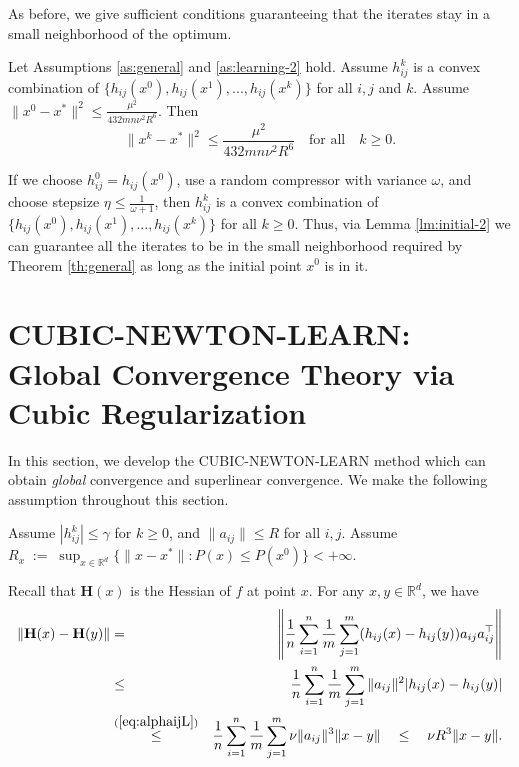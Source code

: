 \documentclass[12pt]{article}
\newcommand{\eqdef}{\; { := }\;}
\newcommand{\R}{\mathbb{R}}
\newcommand{\newalpha}{h}
\newcommand{\mH}{\mathbf{H}}
\begin{document}
As before, we give sufficient conditions guaranteeing that the iterates stay in a small neighborhood of the optimum.
\begin{lemma}\label{lm:initial-2}
	Let Assumptions \ref{as:general} and \ref{as:learning-2} hold. Assume $h_{ij}^k$ is a convex combination of $\{  \newalpha_{ij}(x^0), \newalpha_{ij}(x^1), ..., \newalpha_{ij}(x^k)  \}$ for all $i,j$ and $k$. Assume $\|x^0 - x^*\|^2 \leq \frac{\mu^2}{432mn \nu^2R^6}$. Then 	$$
	\|x^k - x^*\|^2 \leq \frac{\mu^2}{432mn \nu^2R^6} \quad \text{for all} \quad k\geq 0. $$
\end{lemma}


If we choose $h_{ij}^0 = \newalpha_{ij}(x^0)$, use a random  compressor with variance $\omega$, and choose stepsize $\eta \leq \frac{1}{\omega + 1}$, then $h_{ij}^k$ is a convex combination of $\{  \newalpha_{ij}(x^0), \newalpha_{ij}(x^1), ..., \newalpha_{ij}(x^k)  \}$ for all $k\geq 0$. Thus, via Lemma \ref{lm:initial-2} we can guarantee all the iterates to be in the small neighborhood required by Theorem \ref{th:general} as long as the initial point $x^0$ is in it.  





\section{{\sf CUBIC-NEWTON-LEARN}: Global Convergence Theory via Cubic Regularization} \label{sec:CUBIC-NEWTON-LEARN}



In this section, we develop the {\sf CUBIC-NEWTON-LEARN} method which can obtain {\em global} convergence and superlinear convergence.  We make the following assumption throughout this section.

\begin{assumption}\label{as:cubic}
	Assume $|h_{ij}^k| \leq \gamma$ for $k\geq 0$, and $\|a_{ij}\| \leq R$ for all $i,j$. Assume $R_x \eqdef \sup_{x\in \R^d} \{  \|x-x^*\| : P(x) \leq P(x^0)  \} < + \infty$. 
\end{assumption}


Recall that $\mH(x)$ is the Hessian of $f$ at point $x$. For any $x, y \in \R^d$, we have 
\begin{eqnarray*}
\|\mH(x) - \mH(y)\|	&= & \left\| \frac{1}{n} \sum \limits_{i=1}^n \frac{1}{m} \sum\limits_{j=1}^{m}( \newalpha_{ij}(x) - \newalpha_{ij}(y) )a_{ij}a_{ij}^\top  \right\| \\ 
&\leq & \frac{1}{n} \sum\limits_{i=1}^n \frac{1}{m} \sum\limits_{j=1}^{m} \|a_{ij}\|^2 |\newalpha_{ij}(x) - \newalpha_{ij}(y)| \\ 
&\overset{(\ref{eq:alphaijL})}{\leq} & \frac{1}{n} \sum\limits_{i=1}^n \frac{1}{m} \sum\limits_{j=1}^{m} \nu \|a_{ij}\|^3 \|x-y\| \quad \leq \quad \nu R^3 \|x-y\|. 
\end{eqnarray*}
\end{document}

